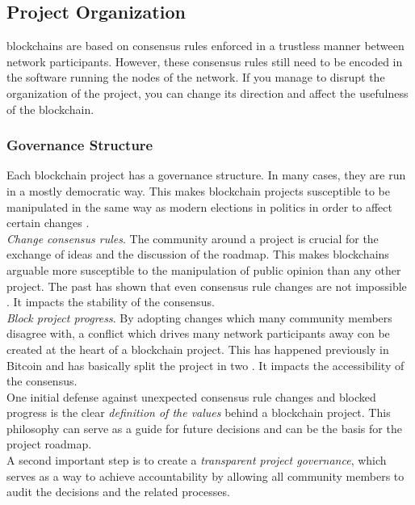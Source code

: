\documentclass[12pt,a4paper]{article}
\begin{document}
\subsection{Project Organization}

\Glspl{blockchain} are based on consensus rules enforced in a trustless manner between network participants. However, these consensus rules still need to be encoded in the software running the nodes of the network. If you manage to disrupt the organization of the project, you can change its direction and affect the usefulness of the \gls{blockchain}.\\

\subsubsection{Governance Structure}

Each blockchain project has a governance structure. In many cases, they are run in a mostly democratic way. This makes blockchain projects susceptible to be manipulated in the same way as modern elections in politics in order to affect certain changes \cite{fakenews}.\\

\textit{Change consensus rules}. The community around a project is crucial for the exchange of ideas and the discussion of the roadmap. This makes \glspl{blockchain} arguable more susceptible to the manipulation of public opinion than any other project. The past has shown that even consensus rule changes are not impossible \cite{forks}. It impacts the stability of the \gls{consensus}.\\

\textit{Block project progress}. By adopting changes which many community members disagree with, a conflict which drives many network participants away con be created at the heart of a blockchain project. This has happened previously in Bitcoin and has basically split the project in two \cite{cash}. It impacts the accessibility of the \gls{consensus}.\\

One initial defense against unexpected consensus rule changes and blocked progress is the clear \textit{definition of the values} behind a blockchain project. This philosophy can serve as a guide for future decisions and can be the basis for the project roadmap.\\

A second important step is to create a \textit{transparent project governance}, which serves as a way to achieve accountability by allowing all community members to audit the decisions and the related processes.\\
\end{document}
